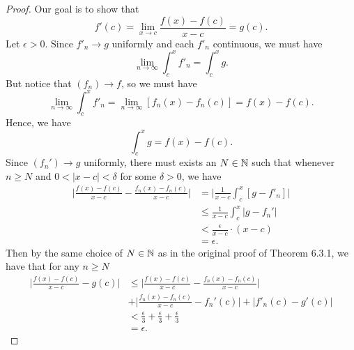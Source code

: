 \begin{proof}
Our goal is to show that 
\[  f'(c) = \lim_{ x \to c }  \frac{ f(x) - f(c) }{ x -c  } = g(c). \] Let \( \epsilon > 0  \). Since \( f'_{n} \to g  \) uniformly and each \( f'_{n}  \) continuous, we must have 
\[  \lim_{ n \to \infty  }  \int_{ c }^{ x } f'_{n}   = \int_{ c }^{ x } g.  \]
But notice that \( (f_{n}) \to f  \), so we must have 
\[  \lim_{ n \to \infty  } \int_{ c }^{ x } f'_n = \lim_{ n \to \infty  } [f_{n}(x) - f_{n}(c)] = f(x) - f(c). \] Hence, we have 
\[  \int_{ c }^{ x } g  = f(x) - f(c).\]  Since \( (f_{n}') \to g  \) uniformly, there must exists an \( N \in \mathbb{N}  \) such that whenever \( n \geq N  \) and \( 0 <  | x -c  | < \delta  \) for some \( \delta > 0  \), we have
\begin{align*}
	\Big| \frac{ f(x) - f(c)  }{ x -c  } - \frac{ f_{n}(x) - f_{n}(c)  }{ x -c  }  \Big| &= \Big| \frac{ 1 }{ x -c  } \int_{ c }^{ x } [ g - f'_n]   \Big|  \\
																						 &\leq \frac{ 1 }{ x -c  } \int_{ c }^{ x } | g - f_{n}' |  \\
																						 &< \frac{ \epsilon  }{ x -c  } \cdot ( x -c ) \\
																						 &= \epsilon.
\end{align*}
Then by the same choice of \( N \in \mathbb{N}  \) as in the original proof of Theorem 6.3.1, we have that for any \( n \geq N  \)
\begin{align*}
	\Big| \frac{ f(x) - f(c) }{ x - c   } - g(c) \Big| &\leq \Big| \frac{ f(x) - f(c)  }{ x -c  } - \frac{ f_{n}(x) - f_{n}(c)  }{ x - c  }  \Big| \\  &+ \Big|  \frac{ f_{n}(x) - f_{n}(c)  }{ x -c  } - f_n'(c)  \Big| + | f'_{n}(c) - g'(c)  |   \\
													   &< \frac{ \epsilon  }{ 3  }  + \frac{ \epsilon  }{ 3  } + \frac{ \epsilon  }{ 3  }  \\
													   &= \epsilon.
\end{align*}
\end{proof}





